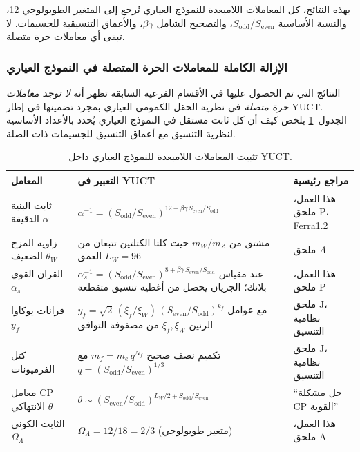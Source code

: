 \documentclass[12pt,a4paper]{article}
\begin{document}
	بهذه النتائج، كل المعاملات اللامبعدة للنموذج العياري تُرجع إلى المتغير الطوبولوجي 12، والنسبة الأساسية \(S_{\mathrm{odd}}/S_{\mathrm{even}}\)، والتصحيح الشامل \(\beta\gamma\)، والأعماق التنسيقية للجسيمات. لا تبقى أي معاملات حرة متصلة.
	
	\subsubsection{الإزالة الكاملة للمعاملات الحرة المتصلة في النموذج العياري}
	النتائج التي تم الحصول عليها في الأقسام الفرعية السابقة تظهر أنه \emph{لا توجد معاملات حرة متصلة} في نظرية الحقل الكمومي العياري بمجرد تضمينها في إطار YUCT. الجدول~\ref{tab:SMparams} يلخص كيف أن كل ثابت مستقل في النموذج العياري يُحدد بالأعداد الأساسية لنظرية التنسيق مع أعماق التنسيق للجسيمات ذات الصلة.
	
	\begin{table}[htbp]
		\centering
		\caption{تثبيت المعاملات اللامبعدة للنموذج العياري داخل YUCT.}
		\label{tab:SMparams}
		\small
		\begin{tabular}{@{}p{3.0cm} p{5.2cm} p{5.2cm}@{}}
			\toprule
			\textbf{المعامل} & \textbf{التعبير في YUCT} & \textbf{مراجع رئيسية} \\
			\midrule
			ثابت البنية الدقيقة \(\alpha\) &
			\(\alpha^{-1} = (S_{\mathrm{odd}}/S_{\mathrm{even}})^{12+\beta\gamma\,S_{\mathrm{even}}/S_{\mathrm{odd}}}\) &
			هذا العمل، ملحق P، Ferra1.2 \\
			زاوية المزج الضعيف \(\theta_W\) &
			مشتق من \(m_W/m_Z\) حيث كلتا الكتلتين تتبعان من العمق \(L_W=96\) &
			ملحق \(\Lambda\) \\
			القران القوي \(\alpha_s\) &
			\(\alpha_s^{-1} = (S_{\mathrm{odd}}/S_{\mathrm{even}})^{8+\beta\gamma\,S_{\mathrm{even}}/S_{\mathrm{odd}}}\) عند مقياس بلانك؛ الجريان يحصل من أغطية تنسيق متقطعة &
			هذا العمل، ملحق P \\
			قرانات يوكاوا \(y_f\) &
			\(y_f = \sqrt{2}\,(\xi_f/\xi_W)\,(S_{\mathrm{even}}/S_{\mathrm{odd}})^{k_f}\) مع عوامل الرنين \(\xi_f,\xi_W\) من مصفوفة التوافق &
			ملحق J، نظامية التنسيق \\
			كتل الفرميونات & تكميم نصف صحيح \(m_f = m_e\,q^{N_f}\) مع \(q=(S_{\mathrm{odd}}/S_{\mathrm{even}})^{1/3}\) &
			ملحق J، نظامية التنسيق \\
			معامل CP الانتهاكي \(\theta\) &
			\(\theta \sim (S_{\mathrm{even}}/S_{\mathrm{odd}})^{L_W/2 + S_{\mathrm{odd}}/S_{\mathrm{even}}}\) &
			``حل مشكلة CP القوية'' \\
			الثابت الكوني \(\Omega_\Lambda\) &
			\(\Omega_\Lambda = 12/18 = 2/3\) (متغير طوبولوجي) &
			هذا العمل، ملحق A \\
			\bottomrule
		\end{tabular}
	\end{table}
	
\end{document}
